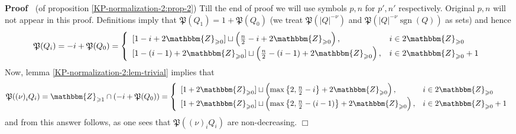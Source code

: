 \documentclass{article}
\newcommand{\tmop}[1]{\ensuremath{\operatorname{#1}}}
\newenvironment{proof}{\noindent\textbf{Proof\ }}{\hspace*{\fill}$\Box$\medskip}
\numberwithin{definition}{section}
\numberwithin{lemma}{section}
\numberwithin{proposition}{section}
{\theorembodyfont{\rmfamily}\newtheorem{remark}{Remark}
\numberwithin{remark}{section}
}
\begin{document}
\begin{proof}
  (of proposition \ref{KP-normalization-2:prop-2}) Till the end of proof we
  will use symbols $p, n$ for $p', n'$ respectively. Original $p, n$ will not
  appear in this proof. Definitions imply that $\mathfrak{P} ( Q_1) = 1
  +\mathfrak{P} ( Q_0)$ (we treat $\mathfrak{P} ( | Q |^{- \nu})$ and
  $\mathfrak{P} ( | Q |^{- \nu} \tmop{sgn} ( Q))$ as sets) and hence
  \[ \mathfrak{P} ( Q_i) = - i +\mathfrak{P} ( Q_0) = \left\{
     \begin{array}{ll}
       {}[ 1 - i + 2\mathbbm{Z}_{\geqslant 0}] \sqcup \left( \frac{n}{2} - i +
       2\mathbbm{Z}_{\geqslant 0} \right), & i \in 2\mathbbm{Z}_{\geqslant
       0}\\
       {}[ 1 - ( i - 1) + 2\mathbbm{Z}_{\geqslant 0}] \sqcup \left(
       \frac{n}{2} - ( i - 1) + 2\mathbbm{Z}_{\geqslant 0} \right), & i \in
       2\mathbbm{Z}_{\geqslant 0} + 1
     \end{array} \right. \]
  Now, lemma \ref{KP-normalization-2:lem-trivial} implies that
  \[ \mathfrak{P} ( ( \nu)^{}_i Q_i) =\mathbbm{Z}_{\geqslant 1} \cap ( - i
     +\mathfrak{P} ( Q_0)) = \left\{ \begin{array}{ll}
       {}[ 1 + 2\mathbbm{Z}_{\geqslant 0}] \sqcup \left( \max \left\{ 2,
       \frac{n}{2} - i \right\} + 2\mathbbm{Z}_{\geqslant 0} \right), & i \in
       2\mathbbm{Z}_{\geqslant 0}\\
       {}[ 1 + 2\mathbbm{Z}_{\geqslant 0}] \sqcup \left( \max \left\{ 2,
       \frac{n}{2} - ( i - 1) \right\} + 2\mathbbm{Z}_{\geqslant 0} \right), &
       i \in 2\mathbbm{Z}_{\geqslant 0} + 1
     \end{array} \right. \]
  and from this answer follows, as one sees that $\mathfrak{P} ( ( \nu)^{}_i
  Q_i)$ are non-decreasing.
\end{proof}
\end{document}
